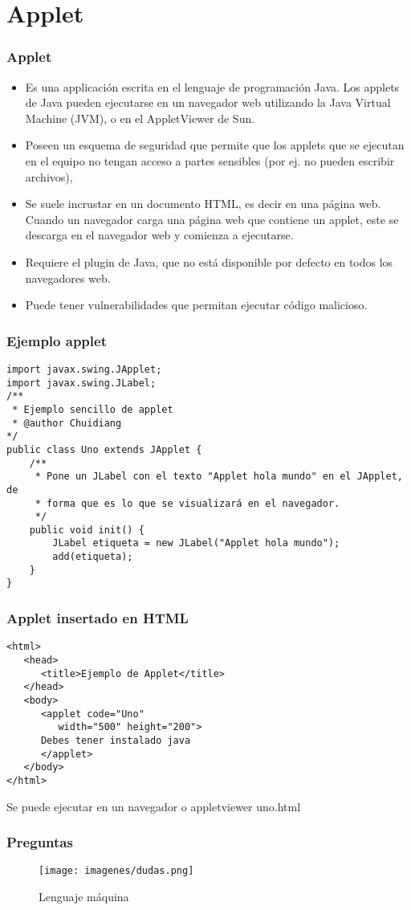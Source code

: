 \documentclass{beamer}
\begin{document}
\section{Applet}

\begin{frame}
\frametitle{Applet}
\begin{itemize}[<+->]
\item Es una applicación escrita en el lenguaje de programación Java. Los applets de Java pueden ejecutarse en un navegador web utilizando la Java Virtual Machine (JVM), o en el AppletViewer de Sun.
\item Poseen un esquema de seguridad que permite que los applets que se ejecutan en el equipo no tengan acceso a partes sensibles (por ej. no pueden escribir archivos), 
\item Se suele incrustar en un documento HTML, es decir en una página web. Cuando un navegador carga una página web que contiene un applet, este se descarga en el navegador web y comienza a ejecutarse. 
\item Requiere el plugin de Java, que no está disponible por defecto en todos los navegadores web.
\item Puede tener vulnerabilidades que permitan ejecutar código malicioso.
\end{itemize}
\end{frame}

\begin{frame}[fragile]
\frametitle{Ejemplo applet}
\begin{verbatim}
import javax.swing.JApplet;
import javax.swing.JLabel;
/**
 * Ejemplo sencillo de applet
 * @author Chuidiang
*/
public class Uno extends JApplet {
	/**
	 * Pone un JLabel con el texto "Applet hola mundo" en el JApplet, de
	 * forma que es lo que se visualizará en el navegador.
	 */
	public void init() {
		JLabel etiqueta = new JLabel("Applet hola mundo");
		add(etiqueta);
	}
}
\end{verbatim}
\end{frame}

\begin{frame}[fragile]
\frametitle{Applet insertado en HTML}
\begin{verbatim}
<html>
   <head>
      <title>Ejemplo de Applet</title>
   </head>
   <body>
      <applet code="Uno"
         width="500" height="200">
      Debes tener instalado java
      </applet>
   </body>
</html>
\end{verbatim}
\pause
Se puede ejecutar en un navegador o appletviewer uno.html
\end{frame}










\begin{frame}
\frametitle{Preguntas} 
\begin{figure}
\texttt{[image: imagenes/dudas.png]} 
\caption{Lenguaje máquina}
\end{figure} 
\end{frame}
\end{document}

